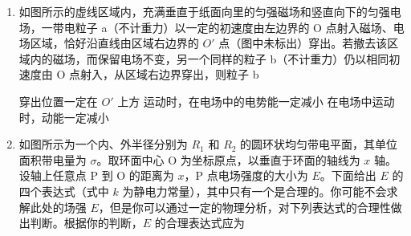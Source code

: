 \documentclass[\gkver]{gaokaozhenti}
\begin{document}
\begin{enumerate}

{给滑块沿斜面向下的初速度，如果 $\mu<\tan\theta$，滑块将减速下滑}
{用平行于斜面向上的力拉滑块向上匀速运动，如果 $\mu=\tan\theta$，拉力大小应是 $2mg\sin\theta$}
{用平行于斜面向下的力拉滑块向下匀速运动，如果 $\mu=\tan\theta$，拉力大小应是 $mg\sin\theta$}


\item
如图所示的虚线区域内，充满垂直于纸面向里的匀强磁场和竖直向下的匀强电场，一带电粒子 a（不计重力）以一定的初速度由左边界的 O 点射入磁场、电场区域，恰好沿直线由区域右边界的 $O'$ 点（图中未标出）穿出。若撤去该区域内的磁场，而保留电场不变，另一个同样的粒子 b（不计重力）仍以相同初速度由 O 点射入，从区域右边界穿出，则粒子 b


{穿出位置一定在 $O'$ 上方}
{运动时，在电场中的电势能一定减小}
{在电场中运动时，动能一定减小}


\item
如图所示为一个内、外半径分别为 $R_{1}$ 和 $R_{2}$ 的圆环状均匀带电平面，其单位面积带电量为 $\sigma$。取环面中心 O 为坐标原点，以垂直于环面的轴线为 $x$ 轴。设轴上任意点 P 到 O 的距离为 $x$，P 点电场强度的大小为 $E$。下面给出 $E$ 的四个表达式（式中 $k$ 为静电力常量），其中只有一个是合理的。你可能不会求解此处的场强 $E$，但是你可以通过一定的物理分析，对下列表达式的合理性做出判断。根据你的判断，$E$ 的合理表达式应为


\end{enumerate}
\end{document}
